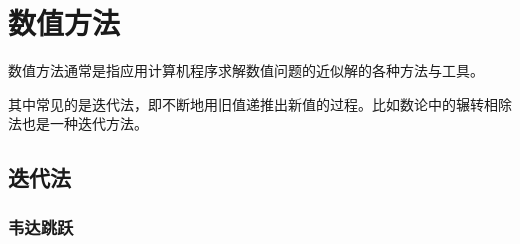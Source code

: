 
\chapter{数值方法}
\label{chap:numerical-method}

数值方法通常是指应用计算机程序求解数值问题的近似解的各种方法与工具。

其中常见的是迭代法，即不断地用旧值递推出新值的过程。比如数论中的辗转相除法也是一种迭代方法。

\section{迭代法}
\label{sec:iteration-method}

\subsection{韦达跳跃}
\label{sec:vieta-jumping}

